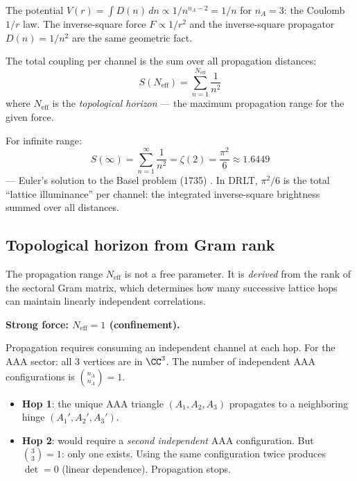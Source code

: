 \begin{remark}
The potential $V(r) = \int D(n)\,dn \propto 1/n^{n_A-2} = 1/n$ for $n_A = 3$: the Coulomb $1/r$ law. The inverse-square force $F \propto 1/r^2$ and the inverse-square propagator $D(n) = 1/n^2$ are the same geometric fact.
\end{remark}

The total coupling per channel is the sum over all propagation distances:
\begin{equation}
S(N_\text{eff}) = \sum_{n=1}^{N_\text{eff}} \frac{1}{n^2}
\label{eq:partial_Basel}
\end{equation}
where $N_\text{eff}$ is the \emph{topological horizon} --- the maximum propagation range for the given force.

For infinite range:
\begin{equation}
S(\infty) = \sum_{n=1}^{\infty} \frac{1}{n^2} = \zeta(2) = \frac{\pi^2}{6} \approx 1.6449
\end{equation}
--- Euler's solution to the Basel problem (1735) \cite{Euler}. In DRLT, $\pi^2/6$ is the total ``lattice illuminance'' per channel: the integrated inverse-square brightness summed over all distances.

\subsection{Topological horizon from Gram rank}
\label{sec:Neff}

The propagation range $N_\text{eff}$ is not a free parameter. It is \emph{derived} from the rank of the sectoral Gram matrix, which determines how many successive lattice hops can maintain linearly independent correlations.

\bigskip

\noindent\textbf{Strong force: $N_\text{eff} = 1$ (confinement).}

Propagation requires consuming an independent channel at each hop. For the AAA sector: all 3 vertices are in $\CC^3$. The number of independent AAA configurations is $\binom{n_A}{n_A} = 1$.

\begin{itemize}
\item \textbf{Hop 1}: the unique AAA triangle $(A_1, A_2, A_3)$ propagates to a neighboring hinge $(A_1', A_2', A_3')$.
\item \textbf{Hop 2}: would require a \emph{second independent} AAA configuration. But $\binom{3}{3} = 1$: only one exists. Using the same configuration twice produces $\det = 0$ (linear dependence). Propagation stops.
\end{itemize}

